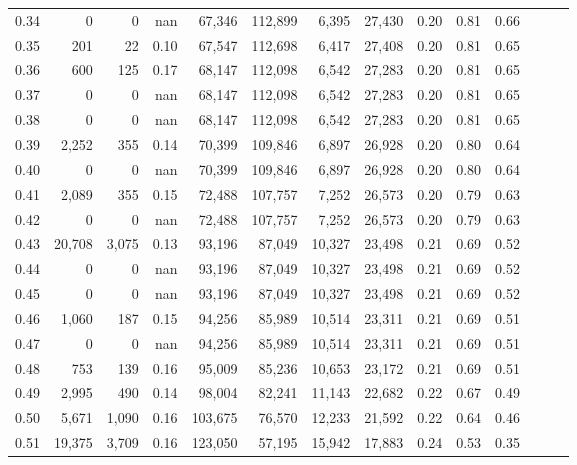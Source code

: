 \begin{tabular}{rrrrrrrrrrrrrr}
0.34 &       0 &      0 &   nan &   67,346 &  112,899 &   6,395 &  27,430 &  0.20 &  0.81 &      0.66 \\
0.35 &     201 &     22 &  0.10 &   67,547 &  112,698 &   6,417 &  27,408 &  0.20 &  0.81 &      0.65 \\
0.36 &     600 &    125 &  0.17 &   68,147 &  112,098 &   6,542 &  27,283 &  0.20 &  0.81 &      0.65 \\
0.37 &       0 &      0 &   nan &   68,147 &  112,098 &   6,542 &  27,283 &  0.20 &  0.81 &      0.65 \\
0.38 &       0 &      0 &   nan &   68,147 &  112,098 &   6,542 &  27,283 &  0.20 &  0.81 &      0.65 \\
0.39 &   2,252 &    355 &  0.14 &   70,399 &  109,846 &   6,897 &  26,928 &  0.20 &  0.80 &      0.64 \\
0.40 &       0 &      0 &   nan &   70,399 &  109,846 &   6,897 &  26,928 &  0.20 &  0.80 &      0.64 \\
0.41 &   2,089 &    355 &  0.15 &   72,488 &  107,757 &   7,252 &  26,573 &  0.20 &  0.79 &      0.63 \\
0.42 &       0 &      0 &   nan &   72,488 &  107,757 &   7,252 &  26,573 &  0.20 &  0.79 &      0.63 \\
0.43 &  20,708 &  3,075 &  0.13 &   93,196 &   87,049 &  10,327 &  23,498 &  0.21 &  0.69 &      0.52 \\
0.44 &       0 &      0 &   nan &   93,196 &   87,049 &  10,327 &  23,498 &  0.21 &  0.69 &      0.52 \\
0.45 &       0 &      0 &   nan &   93,196 &   87,049 &  10,327 &  23,498 &  0.21 &  0.69 &      0.52 \\
0.46 &   1,060 &    187 &  0.15 &   94,256 &   85,989 &  10,514 &  23,311 &  0.21 &  0.69 &      0.51 \\
0.47 &       0 &      0 &   nan &   94,256 &   85,989 &  10,514 &  23,311 &  0.21 &  0.69 &      0.51 \\
0.48 &     753 &    139 &  0.16 &   95,009 &   85,236 &  10,653 &  23,172 &  0.21 &  0.69 &      0.51 \\
0.49 &   2,995 &    490 &  0.14 &   98,004 &   82,241 &  11,143 &  22,682 &  0.22 &  0.67 &      0.49 \\
0.50 &   5,671 &  1,090 &  0.16 &  103,675 &   76,570 &  12,233 &  21,592 &  0.22 &  0.64 &      0.46 \\
0.51 &  19,375 &  3,709 &  0.16 &  123,050 &   57,195 &  15,942 &  17,883 &  0.24 &  0.53 &      0.35 \\

\end{tabular}
